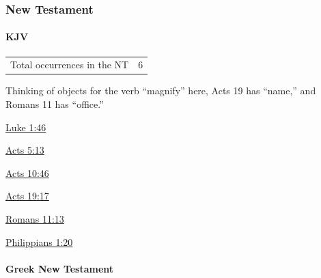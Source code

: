 		
		
	\subsubsection{New Testament} %
		\label{MAGNIFY-NT}
	
		\paragraph{KJV}
			\label{MAGNIFY-NT-KJV}		
	
			\begin{tabular}{ll}
				Total occurrences in the NT & 6
			\end{tabular}
			
			Thinking of objects for the verb ``magnify'' here, Acts 19 has ``name,'' and Romans 11 has ``office.''
			
			\begin{compactdesc}
				\item[{\hyperref[LUKE-1-46]{Luke 1:46}}] 
				\item[{\hyperref[ACTS-5-13]{Acts 5:13}}] 
				\item[{\hyperref[ACTS-10-46]{Acts 10:46}}] 
				\item[{\hyperref[ACTS-19-17]{Acts 19:17}}]
				\item[{\hyperref[ROMANS-11-13]{Romans 11:13}}]
				\item[{\hyperref[PHILIPPIANS-1-20]{Philippians 1:20}}] 
			\end{compactdesc}
			
		\paragraph{Greek New Testament} %
			\label{MAGNIFY-GREEK}
		
			\subparagraph{\texorpdfstring{}{}}
				\label{DOXAZO}
			
